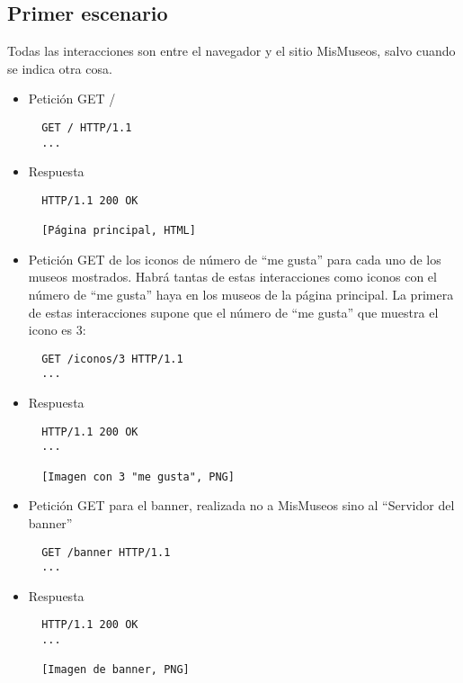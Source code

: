 \subsection*{Primer escenario}

Todas las interacciones son entre el navegador y el sitio MisMuseos, salvo cuando se indica otra cosa.

\begin{itemize}
\item Petición GET /

\begin{verbatim}
  GET / HTTP/1.1
  ...
\end{verbatim}

\item Respuesta

\begin{verbatim}
  HTTP/1.1 200 OK

  [Página principal, HTML]
\end{verbatim}


\item Petición GET de los iconos de número de ``me gusta'' para cada uno de los museos mostrados. Habrá tantas de estas interacciones como iconos con el número de ``me gusta'' haya en los museos de la página principal. La primera de estas interacciones supone que el número de ``me gusta'' que muestra el icono es 3:

\begin{verbatim}
  GET /iconos/3 HTTP/1.1
  ...
\end{verbatim}

\item Respuesta

\begin{verbatim}
  HTTP/1.1 200 OK
  ...

  [Imagen con 3 "me gusta", PNG]
\end{verbatim}


\item Petición GET para el banner, realizada no a MisMuseos sino al ``Servidor del banner''

\begin{verbatim}
  GET /banner HTTP/1.1
  ...
\end{verbatim}

\item Respuesta

\begin{verbatim}
  HTTP/1.1 200 OK
  ...

  [Imagen de banner, PNG]
\end{verbatim}
  


\end{itemize}
